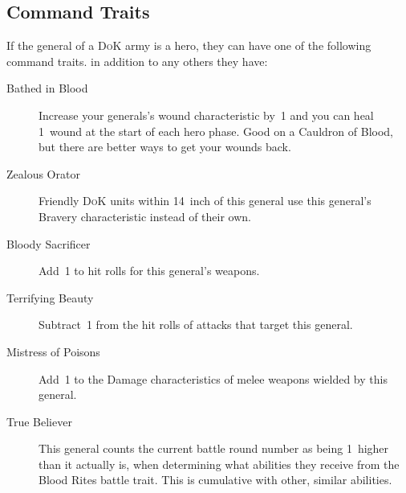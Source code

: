 \hypertarget{command-traits}{%
    \subsection{Command Traits}\label{command-traits}}
If the general of a \textsc{DoK} army is a hero, they can have
one of the following command traits. in addition to any others they
have: 
\begin{description} 
\item [Bathed in Blood] Increase your generals's wound characteristic by~1 and you 
  can heal 1~wound at the start of each hero phase. Good on a Cauldron of Blood, but 
  there are better ways to get your wounds back.
\item [Zealous Orator] Friendly \textsc{DoK} units
  within 14~inch of this general use this general's Bravery characteristic
  instead of their own.
\item [Bloody Sacrificer] Add~1 to hit rolls for this
  general's weapons.
\item [Terrifying Beauty] Subtract~1 from the hit rolls of
  attacks that target this general.
\item [Mistress of Poisons] Add~1 to the Damage
  characteristics of melee weapons wielded by this general.
\item [True Believer] This general counts the current battle
  round number as being 1~higher than it actually is, when determining
  what abilities they receive from the Blood Rites battle trait.
  This is cumulative with other, similar abilities.
\end{description}


